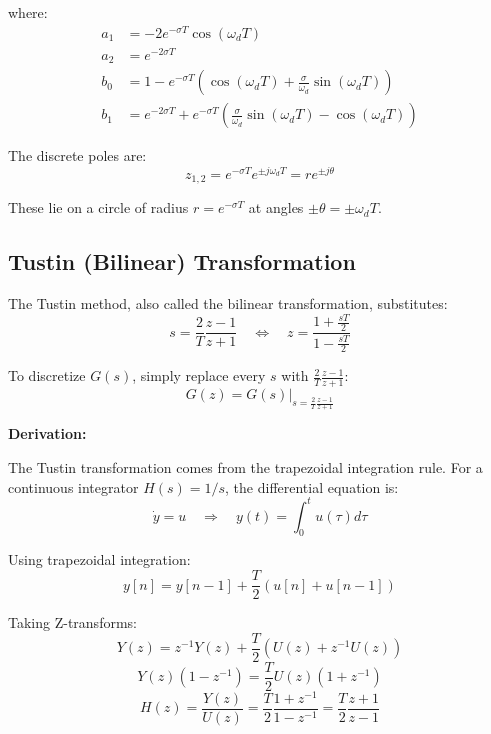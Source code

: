\begin{example}
where:
\begin{align}
a_1 &= -2e^{-\sigma T}\cos(\omega_d T) \\
a_2 &= e^{-2\sigma T} \\
b_0 &= 1 - e^{-\sigma T}\left(\cos(\omega_d T) + \frac{\sigma}{\omega_d}\sin(\omega_d T)\right) \\
b_1 &= e^{-2\sigma T} + e^{-\sigma T}\left(\frac{\sigma}{\omega_d}\sin(\omega_d T) - \cos(\omega_d T)\right)
\end{align}

The discrete poles are:
\begin{equation}
z_{1,2} = e^{-\sigma T}e^{\pm j\omega_d T} = r e^{\pm j\theta}
\end{equation}

These lie on a circle of radius $r = e^{-\sigma T}$ at angles $\pm\theta = \pm\omega_d T$.
\end{example}

\subsection{Tustin (Bilinear) Transformation}

The Tustin method, also called the bilinear transformation, substitutes:
\begin{equation}
\boxed{s = \frac{2}{T}\frac{z-1}{z+1} \quad \Leftrightarrow \quad z = \frac{1 + \frac{sT}{2}}{1 - \frac{sT}{2}}}
\label{eq:tustin_transform}
\end{equation}

To discretize $G(s)$, simply replace every $s$ with $\frac{2}{T}\frac{z-1}{z+1}$:
\begin{equation}
G(z) = G(s)\Big|_{s = \frac{2}{T}\frac{z-1}{z+1}}
\end{equation}

\textbf{Derivation:}

The Tustin transformation comes from the trapezoidal integration rule. For a continuous integrator $H(s) = 1/s$, the differential equation is:
\begin{equation}
\dot{y} = u \quad \Rightarrow \quad y(t) = \int_0^t u(\tau) d\tau
\end{equation}

Using trapezoidal integration:
\begin{equation}
y[n] = y[n-1] + \frac{T}{2}(u[n] + u[n-1])
\end{equation}

Taking Z-transforms:
\begin{equation}
Y(z) = z^{-1}Y(z) + \frac{T}{2}(U(z) + z^{-1}U(z))
\end{equation}
\begin{equation}
Y(z)(1 - z^{-1}) = \frac{T}{2}U(z)(1 + z^{-1})
\end{equation}
\begin{equation}
H(z) = \frac{Y(z)}{U(z)} = \frac{T}{2}\frac{1 + z^{-1}}{1 - z^{-1}} = \frac{T}{2}\frac{z+1}{z-1}
\end{equation}

